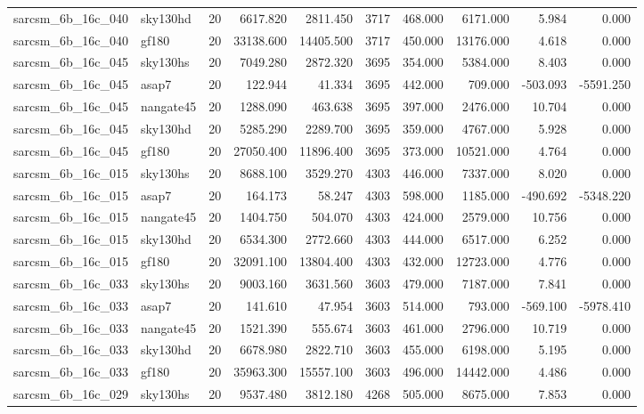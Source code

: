 \begin{longtable}{llrrrrrrrr}
sarcsm\_6b\_16c\_040 & sky130hd & 20 & 6617.820 & 2811.450 & 3717 & 468.000 & 6171.000 & 5.984 & 0.000 \\
sarcsm\_6b\_16c\_040 & gf180 & 20 & 33138.600 & 14405.500 & 3717 & 450.000 & 13176.000 & 4.618 & 0.000 \\
sarcsm\_6b\_16c\_045 & sky130hs & 20 & 7049.280 & 2872.320 & 3695 & 354.000 & 5384.000 & 8.403 & 0.000 \\
sarcsm\_6b\_16c\_045 & asap7 & 20 & 122.944 & 41.334 & 3695 & 442.000 & 709.000 & -503.093 & -5591.250 \\
sarcsm\_6b\_16c\_045 & nangate45 & 20 & 1288.090 & 463.638 & 3695 & 397.000 & 2476.000 & 10.704 & 0.000 \\
sarcsm\_6b\_16c\_045 & sky130hd & 20 & 5285.290 & 2289.700 & 3695 & 359.000 & 4767.000 & 5.928 & 0.000 \\
sarcsm\_6b\_16c\_045 & gf180 & 20 & 27050.400 & 11896.400 & 3695 & 373.000 & 10521.000 & 4.764 & 0.000 \\
sarcsm\_6b\_16c\_015 & sky130hs & 20 & 8688.100 & 3529.270 & 4303 & 446.000 & 7337.000 & 8.020 & 0.000 \\
sarcsm\_6b\_16c\_015 & asap7 & 20 & 164.173 & 58.247 & 4303 & 598.000 & 1185.000 & -490.692 & -5348.220 \\
sarcsm\_6b\_16c\_015 & nangate45 & 20 & 1404.750 & 504.070 & 4303 & 424.000 & 2579.000 & 10.756 & 0.000 \\
sarcsm\_6b\_16c\_015 & sky130hd & 20 & 6534.300 & 2772.660 & 4303 & 444.000 & 6517.000 & 6.252 & 0.000 \\
sarcsm\_6b\_16c\_015 & gf180 & 20 & 32091.100 & 13804.400 & 4303 & 432.000 & 12723.000 & 4.776 & 0.000 \\
sarcsm\_6b\_16c\_033 & sky130hs & 20 & 9003.160 & 3631.560 & 3603 & 479.000 & 7187.000 & 7.841 & 0.000 \\
sarcsm\_6b\_16c\_033 & asap7 & 20 & 141.610 & 47.954 & 3603 & 514.000 & 793.000 & -569.100 & -5978.410 \\
sarcsm\_6b\_16c\_033 & nangate45 & 20 & 1521.390 & 555.674 & 3603 & 461.000 & 2796.000 & 10.719 & 0.000 \\
sarcsm\_6b\_16c\_033 & sky130hd & 20 & 6678.980 & 2822.710 & 3603 & 455.000 & 6198.000 & 5.195 & 0.000 \\
sarcsm\_6b\_16c\_033 & gf180 & 20 & 35963.300 & 15557.100 & 3603 & 496.000 & 14442.000 & 4.486 & 0.000 \\
sarcsm\_6b\_16c\_029 & sky130hs & 20 & 9537.480 & 3812.180 & 4268 & 505.000 & 8675.000 & 7.853 & 0.000 \\

\end{longtable}

